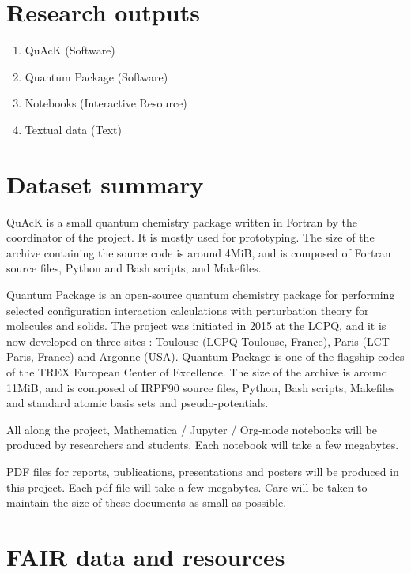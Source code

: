 \documentclass[12pt,onecolumn,notitlepage]{revtex4-1}
\begin{document}
\section{Research outputs}

\begin{enumerate}
\item QuAcK (Software)
\item Quantum Package (Software)
\item Notebooks (Interactive Resource)
\item Textual data (Text)
\end{enumerate}



\section{Dataset summary}

QuAcK is a small quantum chemistry package written in Fortran by the
coordinator of the project. It is mostly used for prototyping.
The size of the archive containing the source code is around 4MiB, and
is composed of Fortran source files, Python and Bash scripts, and
Makefiles.

Quantum Package is an open-source quantum chemistry package for
performing selected configuration interaction calculations with
perturbation theory for molecules and solids.
The project was initiated in 2015 at the LCPQ, and it is now
developed on three sites : Toulouse (LCPQ Toulouse, France), Paris
(LCT Paris, France) and Argonne (USA). Quantum Package is one of
the flagship codes of the TREX European Center of Excellence.
The size of the archive is around 11MiB, and is composed of IRPF90
source files, Python, Bash scripts, Makefiles and standard atomic
basis sets and pseudo-potentials.

All along the project, Mathematica / Jupyter / Org-mode notebooks will
be produced by researchers and students. Each notebook will take a
few megabytes.

PDF files for reports, publications, presentations and posters will
be produced in this project. Each pdf file will take a few megabytes.
Care will be taken to maintain the size of these documents as small
as possible.




\section{FAIR data and resources}
\end{document}
